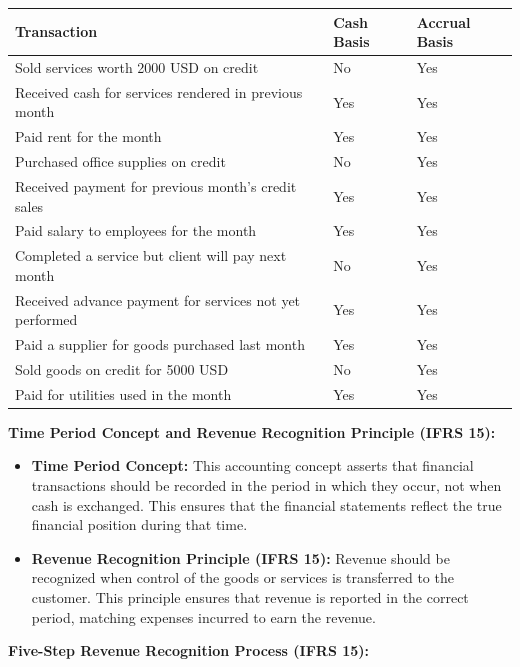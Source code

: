 \documentclass[12pt,a4paper]{book}
\begin{document}
\begin{center}
\begin{tabular}{|p{12cm}|p{2cm}|p{2cm}|}
\hline
\textbf{Transaction} & \textbf{Cash Basis} & \textbf{Accrual Basis} \\
\hline
Sold services worth 2000 USD on credit & No & Yes \\
\hline
Received cash for services rendered in previous month & Yes & Yes \\
\hline
Paid rent for the month & Yes & Yes \\
\hline
Purchased office supplies on credit & No & Yes \\
\hline
Received payment for previous month's credit sales & Yes & Yes \\
\hline
Paid salary to employees for the month & Yes & Yes \\
\hline
Completed a service but client will pay next month & No & Yes \\
\hline
Received advance payment for services not yet performed & Yes & Yes \\
\hline
Paid a supplier for goods purchased last month & Yes & Yes \\
\hline
Sold goods on credit for 5000 USD & No & Yes \\
\hline
Paid for utilities used in the month & Yes & Yes \\
\hline
\end{tabular}
\end{center}

\vspace{0.5cm}
\textbf{Time Period Concept and Revenue Recognition Principle (IFRS 15):}

\begin{itemize}
    \item \textbf{Time Period Concept:} This accounting concept asserts that financial transactions should be recorded in the period in which they occur, not when cash is exchanged. This ensures that the financial statements reflect the true financial position during that time.
    \item \textbf{Revenue Recognition Principle (IFRS 15):} Revenue should be recognized when control of the goods or services is transferred to the customer. This principle ensures that revenue is reported in the correct period, matching expenses incurred to earn the revenue.
\end{itemize}

\vspace{0.5cm}
\textbf{Five-Step Revenue Recognition Process (IFRS 15):}
\end{document}
